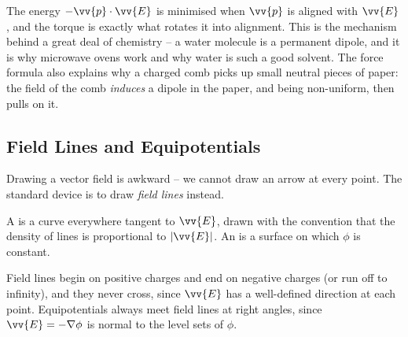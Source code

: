 The energy $-\vv{p}\cdot\vv{E}$ is minimised when $\vv{p}$ is aligned with $\vv{E}$, and the torque is exactly what rotates it into alignment. This is the mechanism behind a great deal of chemistry -- a water molecule is a permanent dipole, and it is why microwave ovens work and why water is such a good solvent. The force formula also explains why a charged comb picks up small neutral pieces of paper: the field of the comb \emph{induces} a dipole in the paper, and being non-uniform, then pulls on it.

\subsection{Field Lines and Equipotentials}

Drawing a vector field is awkward -- we cannot draw an arrow at every point. The standard device is to draw \emph{field lines} instead.

\begin{definition}
	A  is a curve everywhere tangent to $\vv{E}$, drawn with the convention that the density of lines is proportional to $|\vv{E}|$. An  is a surface on which $\phi$ is constant.
\end{definition}

Field lines begin on positive charges and end on negative charges (or run off to infinity), and they never cross, since $\vv{E}$ has a well-defined direction at each point. Equipotentials always meet field lines at right angles, since $\vv{E} = -\nabla\phi$ is normal to the level sets of $\phi$.

